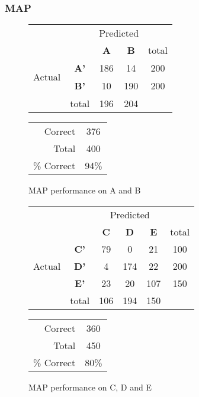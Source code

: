 \subsubsection{MAP}
\begin{figure}[!ht]
\begin{minipage}[b]{0.5\linewidth}
\centering
	\begin{tabular}{ccc|c|c}
	 & &\multicolumn{2}{c}{Predicted} &\\
	  & & \bf{A} &  \bf{B} & total \\
	 \cline{3-5}
	 \multirow{2}{*}{\begin{sideways}Actual\end{sideways}} & \bf{A'}& 186 & 14 & 200 \\
	 \cline{3-5}
	 & \bf{B'}& 10 & 190 & 200 \\
	  \cline{3-5}
	 &total&196&204&\\
	\end{tabular}
\end{minipage}
\hspace{0.5cm}
\begin{minipage}[b]{0.5\linewidth}
	\begin{tabular}{r|c}
	\hline
	Correct& 376\\
	Total& 400\\
	\hline
	\% Correct& 94\%\\
	\hline
	\end{tabular}
\end{minipage}
\vspace{1mm}
\caption{MAP performance on A and B}
\end{figure}


\begin{figure}[!ht]
\begin{minipage}[b]{0.5\linewidth}
\centering
	\begin{tabular}{ccc|c|c|c}
	 & &\multicolumn{3}{c}{Predicted} &\\
	  & & \bf{C} &  \bf{D} & \bf{E} & total \\
	 \cline{3-6}
	 \multirow{3}{*}{\begin{sideways}Actual\end{sideways}} & \bf{C'}& 79 & 0 & 21 & 100\\
	 \cline{3-6}
	 & \bf{D'}& 4 & 174 & 22 & 200\\
	  \cline{3-6}
	 & \bf{E'}& 23 & 20 & 107 &  150\\
	  \cline{3-6}
	 &total&106&194&150\\
	\end{tabular}
\end{minipage}
\hspace{0.5cm}
\begin{minipage}[b]{0.5\linewidth}
	\begin{tabular}{r|c}
	\hline
	Correct& 360\\
	Total& 450\\
	\hline
	\% Correct& 80\%\\
	\hline
	\end{tabular}
\end{minipage}
\vspace{1mm}
\caption{MAP performance on C, D and E}
\end{figure}


